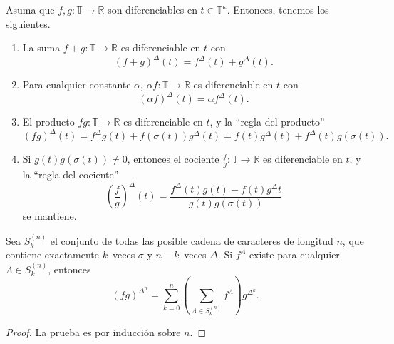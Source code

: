 \begin{frame}
\begin{theorem}
	Asuma que $f,g\colon\mathds{T}\rightarrow\mathds{R}$ son diferenciables en $t\in\mathds{T}^{\kappa}$. Entonces, tenemos los siguientes.
	\begin{enumerate}
		\item La suma $f+g\colon\mathds{T}\rightarrow\mathds{R}$ es diferenciable en $t$ con \[ {\left(f+g\right)}^{\Delta}\left(t\right)=f^{\Delta}\left(t\right)+g^{\Delta}\left(t\right). \]
		\item Para cualquier constante $\alpha$, $\alpha f\colon\mathds{T}\rightarrow\mathds{R}$ es diferenciable en $t$ con \[ {\left(\alpha f\right)}^{\Delta}\left(t\right)=\alpha f^{\Delta}\left(t\right). \]
		\item El producto $fg\colon\mathds{T}\rightarrow\mathds{R}$ es diferenciable en $t$, y la ``regla del producto'' \[ {\left(fg\right)}^{\Delta}\left(t\right)=f^{\Delta}g\left(t\right)+f\left(\sigma\left(t\right)\right)g^{\Delta}\left(t\right)=f\left(t\right)g^{\Delta}\left(t\right)+f^{\Delta}\left(t\right)g\left(\sigma\left(t\right)\right). \]
		\item Si $g\left(t\right)g\left(\sigma\left(t\right)\right)\neq0$, entonces el cociente $\frac{f}{g}\colon\mathds{T}\rightarrow\mathds{R}$ es diferenciable en $t$, y la ``regla del cociente'' \[ {\left(\frac{f}{g}\right)}^{\Delta}\left(t\right)=\frac{f^{\Delta}\left(t\right)g\left(t\right)-f\left(t\right)g^{\Delta}t}{g\left(t\right)g\left(\sigma\left(t\right)\right)} \] se mantiene.
	\end{enumerate}
\end{theorem}
\end{frame}

\begin{frame}

\begin{theorem}
	Sea $S_{k}^{\left(n\right)}$ el conjunto de todas las posible cadena de caracteres de longitud $n$, que contiene exactamente $k$--veces $\sigma$ y $n-k$--veces $\Delta$. Si $f^{\Lambda}$ existe para cualquier $\Lambda\in S_{k}^{\left(n\right)}$, entonces \[ {\left(fg\right)}^{\Delta^{n}}=\sum_{k=0}^{n}\left(\sum_{\Lambda\in S_{k}^{\left(n\right)}}f^{\Lambda}\right)g^{\Delta^{k}}. \]
\end{theorem}

\begin{proof}
	La prueba es por inducción sobre $n$.
\end{proof}
\end{frame}

